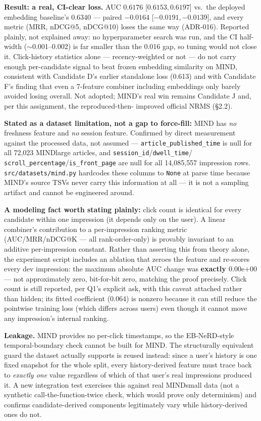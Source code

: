 \documentclass[11pt]{article}
\begin{document}
\textbf{Result: a real, CI-clear loss.} AUC $0.6176$ [$0.6153,0.6197$] vs.\ the
deployed embedding baseline's $0.6340$ --- paired $-0.0164$ [$-0.0191,-0.0139$],
and every metric (MRR, nDCG@5, nDCG@10) loses the same way (ADR-016). Reported
plainly, not explained away: no hyperparameter search was run, and the CI
half-width ($\sim$0.001--0.002) is far smaller than the 0.016 gap, so tuning
would not close it. Click-history statistics alone --- recency-weighted or not
--- do not carry enough per-candidate signal to beat frozen embedding
similarity on MIND, consistent with Candidate D's earlier standalone loss
(0.613) and with Candidate F's finding that even a 7-feature combiner
including embeddings only barely avoided losing overall. Not adopted; MIND's
real win remains Candidate J and, per this assignment, the reproduced-then-
improved official NRMS (\S2.2).

\textbf{Stated as a dataset limitation, not a gap to force-fill:} MIND has
\emph{no} freshness feature and \emph{no} session feature. Confirmed by direct
measurement against the processed data, not assumed --- \texttt{article\_published\_time}
is null for all 72{,}023 MINDlarge articles, and \texttt{session\_id}\slash\texttt{dwell\_time}\slash
\texttt{scroll\_percentage}\slash\texttt{is\_front\_page} are null for all 14{,}085{,}557
impression rows. \texttt{src/datasets/mind.py} hardcodes these columns to \texttt{None}
at parse time because MIND's source TSVs never carry this information at all --- it
is not a sampling artifact and cannot be engineered around.

\textbf{A modeling fact worth stating plainly:} click count is identical for every
candidate within one impression (it depends only on the user). A linear combiner's
contribution to a per-impression ranking metric (AUC/MRR/nDCG@K --- all rank-order-only)
is provably invariant to an additive per-impression constant. Rather than asserting
this from theory alone, the experiment script includes an ablation that zeroes the
feature and re-scores every dev impression: the maximum absolute AUC change was
\textbf{exactly $0.00\mathrm{e}{+00}$} --- not approximately zero, bit-for-bit zero,
matching the proof precisely. Click count is still reported, per Q1's explicit ask,
with this caveat attached rather than hidden; its fitted coefficient (0.064) is
nonzero because it can still reduce the pointwise training loss (which differs
across users) even though it cannot move any impression's internal ranking.

\textbf{Leakage.} MIND provides no per-click timestamps, so the EB-NeRD-style
temporal-boundary check cannot be built for MIND. The structurally equivalent guard
the dataset actually supports is reused instead: since a user's history is one fixed
snapshot for the whole split, every history-derived feature must trace back to
\emph{exactly one} value regardless of which of that user's real impressions produced
it. A new integration test exercises this against real MINDsmall data (not a
synthetic call-the-function-twice check, which would prove only determinism) and
confirms candidate-derived components legitimately vary while history-derived ones
do not.
\end{document}
